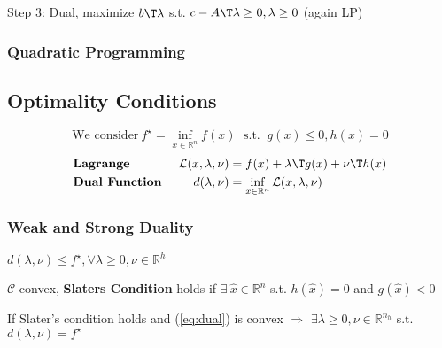 Step 3: Dual,
maximize $b\T\lambda$
s.t.
$c-A\T\lambda\ge0,\lambda\ge0$
(again LP)

\subsubsection{Quadratic Programming}

\subsection{Optimality Conditions}

\begin{equation}
	\text{We consider}\
	f^\star = \inf_{x\in\mathcal{\mathbb{R}}^n}f(x)
	\;\text{ s.t. }\ g(x)\le0,h(x)=0
	\label{eq:dual}
\end{equation}
$$\begin{aligned}
		                           & \textbf{Lagrange }                                              &
		\mathcal{L}(x,\lambda,\nu) & = f(x) + \lambda\T g(x)+\nu\T h(x)
		\\
		                           & \textbf{Dual Function }                                         &
		d(\lambda,\nu)             & = \inf_{x \in \mathcal{\mathbb{R}}^n}\mathcal{L}(x,\lambda,\nu)
	\end{aligned}$$




\subsubsection{Weak and Strong Duality}

\begin{proposition}
	$d(\lambda,\nu)\le f^\star,\forall\lambda\ge0,\nu\in\mathbb{R}^{h}$
\end{proposition}

\begin{definition}
	$\mathcal{C}$ convex, \textbf{Slaters Condition} holds if
	$\exists\ \hat{x} \in \mathbb{R}^{n}$ s.t. $h(\hat{x})=0$ and $g(\hat{x})<0$
\end{definition}

\begin{proposition}
	If Slater's condition holds
	and (\ref{eq:dual}) is convex
	$\Rightarrow$
	$\exists \lambda \ge 0, \nu \in \mathbb{R}^{n_h}$ s.t. $d(\lambda,\nu)=f^\star$
\end{proposition}


